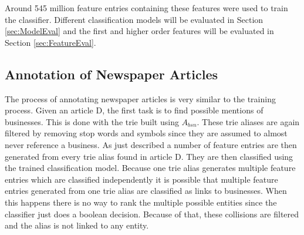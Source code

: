 Around 545 million feature entries containing these features were used to train the classifier. Different classification models will be evaluated in Section \ref{sec:ModelEval} and the first and higher order features will be evaluated in Section \ref{sec:FeatureEval}.

\subsection{Annotation of Newspaper Articles}
The process of annotating newspaper articles is very similar to the training process. Given an article D, the first task is to find possible mentions of businesses. This is done with the trie built using $A_{bsn}$. These trie aliases are again filtered by removing stop words and symbols since they are assumed to almost never reference a business. As just described a number of feature entries are then generated from every trie alias found in article D. They are then classified using the trained classification model. Because one trie alias generates multiple feature entries which are classified independently it is possible that multiple feature entries generated from one trie alias are classified as links to businesses. When this happens there is no way to rank the multiple possible entities since the classifier just does a boolean decision. Because of that, these collisions are filtered and the alias is not linked to any entity.
